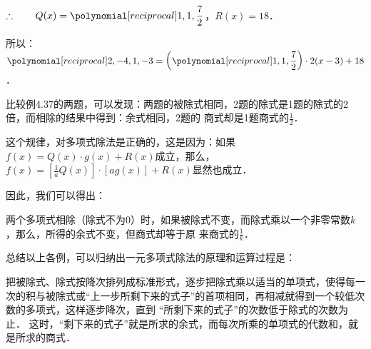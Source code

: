 \begin{solution}
\begin{center}
       \end{center}
$\therefore\qquad Q(x)=\poly{1,1,\frac{7}{2}}$，$R(x)=18$．

所以：$\poly{2,-4,1,-3}=\left(\poly{1,1,\frac{7}{2}}\right)\cdot 2(x-3)+18$．
\end{solution}

比较例4.37的两题，可以发现：两题的被除式相同，2题的除式是1题的除式的2倍，而相除的结果中得到：余式相同，2题的
商式却是1题商式的$\frac{1}{2}$．

这个规律，对多项式除法是正确的，这是因为：如果$f(x)=Q(x)\cdot g(x)+R(x)$成立，那么，$f(x)=\left[\frac{1}{a}Q(x)\right]\cdot [ag(x)]+R(x)$显然也成立．

因此，我们可以得出：

\begin{blk}{}
    两个多项式相除（除式不为0）时，如果被除式不变，而除式乘以一个非零常数$k$，那么，所得的余式不变，但商式却等于原
来商式的$\frac{1}{k}$．
\end{blk}

总结以上各例，可以归纳出一元多项式除法的原理和运算过程是：

把被除式、除式按降次排列成标准形式，逐步把除式乘以适当的单项式，使得每一次的积与被除式或“上一步所剩下来的式子”的首项相同，再相减就得到一个较低次数的多项式，这样逐步降次，直到
“所剩下来的式子”的次数低于除式的次数为止．
这时，“剩下来的式子”就是所求的余式，而每次所乘的单项式的代数和，就是所求的商式．

